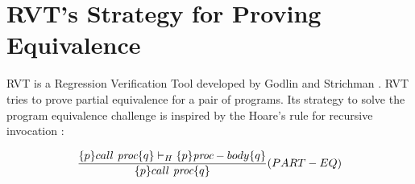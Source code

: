 \label{sec:rvtreview}
\section{RVT's Strategy for Proving Equivalence}
RVT is a Regression Verification Tool developed by Godlin and Strichman \cite{DBLP:conf/dac/GodlinS09}. RVT tries to prove partial equivalence for a pair of programs. Its strategy to solve the program equivalence challenge is inspired by the Hoare's rule for recursive invocation \cite{DBLP:series/lnm/Hoare71}: 

\begin{equation} \label{eqn:parteq}
 {\frac {\{p\} call\ \emph{proc} \{q\} \vdash_H \{p\} \emph{proc}-body \{q\}}{\{p\} call\ \emph{proc} \{q\}}} 
  (PART-EQ) 
\end{equation}

